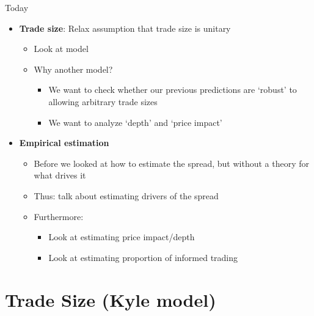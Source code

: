 \documentclass[english,10pt]{beamer}
\begin{document}
\begin{frame}{Today}
	\begin{itemize}
		\item \textbf{Trade size}: Relax assumption that trade size is unitary
		\begin{itemize}
			\item Look at \cite{kyle_continuous_1985} model
			\item Why another model? 
			\begin{itemize}
				\item We want to check whether our previous predictions are `robust' to allowing arbitrary trade sizes
				\item We want to analyze `depth' and `price impact'
			\end{itemize}
		\end{itemize}
		\item \textbf{Empirical estimation}
		\begin{itemize}
			\item Before we looked at how to estimate the spread, but without a theory for what drives it
			\item Thus: talk about estimating drivers of the spread
			\item Furthermore:
			\begin{itemize}
				\item Look at estimating price impact/depth
				\item Look at estimating proportion of informed trading
			\end{itemize}
		\end{itemize}
	\end{itemize}
\end{frame}



\section{Trade Size (Kyle model)}
\end{document}
